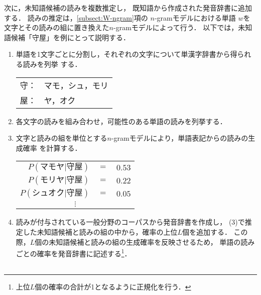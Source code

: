 \documentclass[japanese]{jnlp_1.4}
\newcommand{\cfbox}[1]{}
\begin{document}
次に，未知語候補の読みを複数推定し，
既知語から作成された発音辞書に追加する．
読みの推定は，\ref{subsect:W-ngram}項の
$n$-gramモデルにおける単語
$w$を文字とその読みの組に置き換えた$n$-gramモデルによって行う．
以下では，未知語候補「守屋」を例にとって説明する．
\begin{enumerate}
 \item 単語を1文字ごとに分割し，それぞれの文字について単漢字辞書から得られる読みを列挙
       する．
       \vspace{10pt}
       \begin{center}
	\begin{tabular}{|ll|}\hline
	 守：&マモ，シュ，モリ\\
	 屋：&ヤ，オク\\\hline
	\end{tabular}
        \end{center}
        \vspace{10pt}
 \item 各文字の読みを組み合わせ，可能性のある単語の読みを列挙する．
       \vspace{10pt}
       \cfbox{マモヤ, マモオク, シュヤ, シュオク, モリヤ, モリオク}
       \vspace{10pt}
 \item 文字と読みの組を単位とする$n$-gramモデルにより，単語表記からの読みの生成確率
       を計算する．
       \vspace{10pt}
       \begin{center}
	\begin{tabular}{|rcr|}\hline
       $P(マモヤ|守屋)$ &$=$& $0.53$\\
       $P(モリヤ|守屋)$ &$=$& $0.22$\\
       $P(シュオク|守屋)$ &$=$& $0.05$\\
	 \multicolumn{3}{|c|}{$\vdots$}\\\hline
	\end{tabular}
        \end{center}
        \vspace{10pt}
 \item 読みが付与されている一般分野のコーパスから発音辞書を作成し，
       (3)で推定した未知語候補と読みの組の中から，確率の上位$L$個を追加する．
       この際，$L$個の未知語候補と読みの組の生成確率を反映させるため，
       単語の読みごとの確率を発音辞書に記述する\footnote{
	上位$L$個の確率の合計が1となるように正規化を行う．}．
       \vspace{10pt}
       \begin{center}
	\begin{tabular}{|rrr|rrr|}\hline

\end{tabular}
\end{center}
\end{enumerate}
\end{document}
